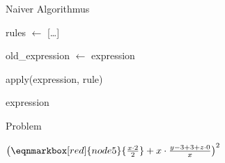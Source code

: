 \begin{frame}{Naiver Algorithmus}

    \begin{algorithm}[H]
        \caption{Naiver Algorithmus zur Optimierung von Ausdrücken}\label{alg:ausdruck1}
        \begin{algorithmic}
          \State rules $\gets$ [\ldots]
          
            \State old\_expression $\gets$ expression
      
              \State apply(expression, rule)
              \EndIf
            \EndFor
          \EndWhile
      
          \State \Return expression
          \EndFunction
        \end{algorithmic}
      \end{algorithm}
   
\end{frame}

\begin{frame}{Problem}

    \begin{center}
        {\Large $\left(\eqnmarkbox[red]{node5}{\frac{x \cdot 2}{2}} + x \cdot \frac{y - 3 + 3 + z \cdot 0}{x}\right)^2$ }\vspace{7mm}
    \end{center}

    \begin{tcbitemize}[raster equal height=rows, raster columns=2,
        raster every box/.style={size=small,valign=center,halign=center,colframe=white,colback=white}]
    \end{tcbitemize}
\end{frame}